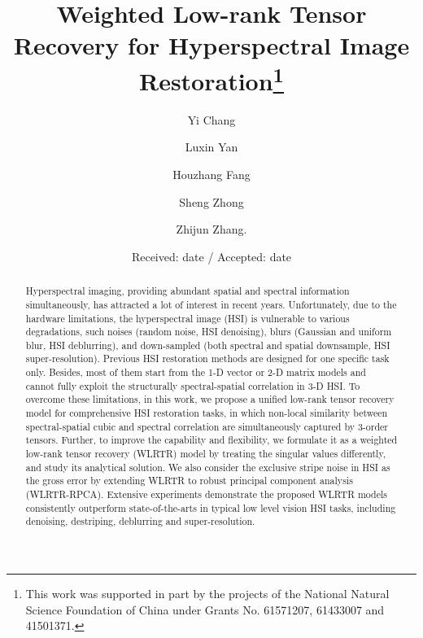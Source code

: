 \documentclass[twocolumn]{svjour3}          %
\begin{document}
\title{Weighted Low-rank Tensor Recovery for Hyperspectral Image Restoration\thanks{This work was supported in part by the projects of the National Natural Science Foundation of China under Grants No. 61571207, 61433007 and 41501371.}
}

\author{Yi Chang         \and
        Luxin Yan          \and
        Houzhang Fang   \and
        Sheng Zhong       \and
        Zhijun Zhang.
}


\vspace{-5mm}
\date{Received: date / Accepted: date}

\maketitle
\begin{abstract}
  Hyperspectral imaging, providing abundant spatial and spectral information simultaneously, has attracted a lot of interest in recent years. Unfortunately, due to the hardware limitations, the hyperspectral image (HSI) is vulnerable to various degradations, such noises (random noise, HSI denoising), blurs (Gaussian and uniform blur, HSI deblurring), and down-sampled (both spectral and spatial downsample, HSI super-resolution). Previous HSI restoration methods are designed for one specific task only. Besides, most of them start from the 1-D vector or 2-D matrix models and cannot fully exploit the structurally spectral-spatial correlation in 3-D HSI. To overcome these limitations, in this work, we propose a unified low-rank tensor recovery model for comprehensive HSI restoration tasks, in which non-local similarity between spectral-spatial cubic and spectral correlation are simultaneously captured by 3-order tensors. Further, to improve the capability and flexibility, we formulate it as a weighted low-rank tensor recovery (WLRTR) model by treating the singular values differently, and study its analytical solution. We also consider the exclusive stripe noise in HSI as the gross error by extending WLRTR to robust principal component analysis (WLRTR-RPCA). Extensive experiments demonstrate the proposed WLRTR models consistently outperform state-of-the-arts in typical low level vision HSI tasks, including denoising, destriping, deblurring and super-resolution.
\end{abstract}
\end{document}
